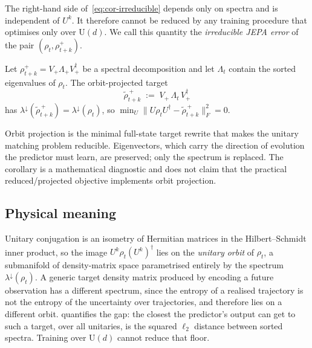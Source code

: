 The right-hand side of~\eqref{eq:cor-irreducible} depends only on spectra and
is independent of $U^{k}$. It therefore cannot be reduced by any training
procedure that optimises only over $\mathrm{U}(d)$. We call this quantity the
\emph{irreducible JEPA error} of the pair $(\rho_{t}, \rho_{t+k}^{+})$.

\begin{corollary}%
\label{cor:orbit}
Let $\rho_{t+k}^{+} = V_{+} \Lambda_{+} V_{+}^{\dagger}$ be a spectral
decomposition and let $\Lambda_{t}$ contain the sorted eigenvalues of
$\rho_{t}$. The orbit-projected target
\begin{equation}\label{eq:orbit-proj-main}
  \widetilde{\rho}_{t+k}^{\,+}
  \;:=\;
  V_{+}\, \Lambda_{t}\, V_{+}^{\dagger}
\end{equation}
has $\lambda^{\downarrow}(\widetilde{\rho}_{t+k}^{\,+}) =
\lambda^{\downarrow}(\rho_{t})$, so
$\min_{U} \lVert U\rho_{t} U^{\dagger} - \widetilde{\rho}_{t+k}^{\,+}
\rVert_{F}^{2} = 0$.
\end{corollary}

Orbit projection is the minimal full-state target rewrite that makes
the unitary matching problem reducible. Eigenvectors, which carry the
direction of evolution the predictor must learn, are preserved; only
the spectrum is replaced. The corollary is a mathematical diagnostic
and does not claim that the practical reduced/projected objective
implements orbit projection.

\subsection{Physical meaning}\label{sec:theorem-physical}

Unitary conjugation is an isometry of Hermitian matrices in the
Hilbert--Schmidt inner product, so the image
$U^{k}\rho_{t}(U^{k})^{\dagger}$ lies on the \emph{unitary orbit} of
$\rho_{t}$, a submanifold of density-matrix space parametrised entirely
by the spectrum $\lambda^{\downarrow}(\rho_{t})$. A generic target
density matrix produced by encoding a future observation has a
different spectrum, since the entropy of a realised trajectory is not
the entropy of the uncertainty over trajectories, and therefore lies
on a different orbit.  quantifies the gap: the
closest the predictor's output can get to such a target, over all
unitaries, is the squared $\ell_{2}$ distance between sorted spectra.
Training over $\mathrm{U}(d)$ cannot reduce that floor.

